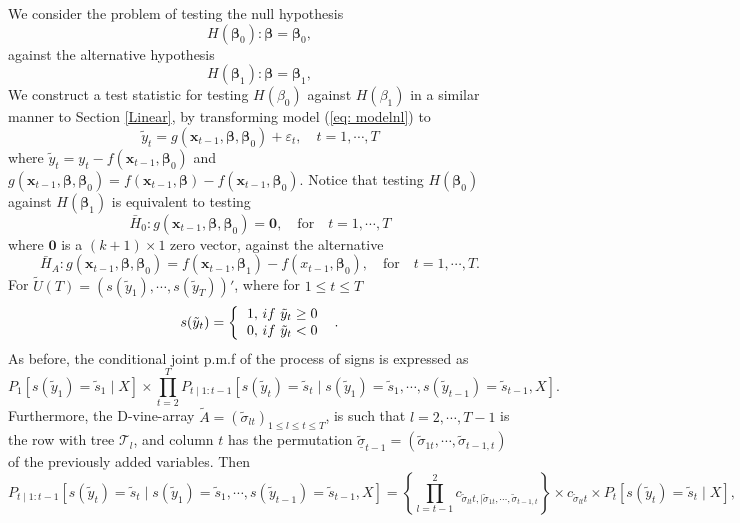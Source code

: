 \documentclass[harvard,11pt]{article}
\begin{document}
We consider the problem of testing the null hypothesis
\begin{equation}\label{eq: nullnl}
H(\bm{\beta}_0):\bm{\beta}=\bm{\beta}_0,
\end{equation}
against the alternative hypothesis
\begin{equation}\label{eq: altnl}
H(\bm{\beta}_1):\bm{\beta}=\bm{\beta}_1,
\end{equation}
We construct a test statistic for testing $H(\beta_0)$ against $H(\beta_1)$ in a similar manner to Section \ref{Linear}, by transforming model (\ref{eq: modelnl}) to 
\[
\tilde{y}_t=g(\bm{x}_{t-1},\bm{\beta},\bm{\beta}_0)+\varepsilon_t,\quad t=1,\cdots,T
\]
where $\tilde{y}_t=y_t-f(\bm{x}_{t-1},\bm{\beta}_0)$ and $g(\bm{x}_{t-1},\bm{\beta},\bm{\beta}_0)=f(\bm{x}_{t-1},\bm{\beta})-f(\bm{x}_{t-1},\bm{\beta}_0)$. Notice that testing $H(\bm{\beta}_0)$ against $H(\bm{\beta}_1)$ is equivalent to testing
\[
\bar{H}_0:g(\bm{x}_{t-1}, \bm{\beta},\bm{\beta}_0)=\bm{0},\quad\text{for}\quad t=1,\cdots,T
\]
where $\bm{0}$ is a $(k+1)\times 1$ zero vector, against the alternative
\[
\bar{H}_A: g(\bm{x}_{t-1},\bm{\beta},\bm{\beta}_0)=f(\bm{x}_{t-1},\bm{\beta}_1)-f(x_{t-1},\bm{\beta}_0),\quad\text{for}\quad t=1,\cdots,T.
\]
For $\tilde{U}(T)=(s(\tilde{y}_1),\cdots,s(\tilde{y}_T))'$, where for $1\leq t\leq T$
\begin{equation*}
s(\tilde{y}_{t})=\left\{ 
\begin{tabular}{l}
$1,$ $if$ $\tilde{y}_{t}\geq 0$ \\ 
$0,$ $if$ $\tilde{y}_{t}<0$%
\end{tabular}%
\ \right. \text{.}
\end{equation*}
As before, the conditional joint p.m.f of the process of signs is expressed as
\begin{equation}\label{eq: IDKANYMORE}
P_1[s(\tilde{y}_1)=\tilde{s}_1\mid X]\times\prod\limits_{t=2}^{T}P_{t\mid 1:{t-1}}[s(\tilde{y}_t)=\tilde{s}_t\mid s(\tilde{y}_1)=\tilde{s}_1,\cdots,s(\tilde{y}_{t-1})=\tilde{s}_{t-1},X].
\end{equation}
Furthermore, the D-vine-array $\tilde{A}=(\tilde{\sigma}_{lt})_{1\leq l\leq t\leq T}$, is such that $l=2,\cdots,T-1$ is the row with tree $\mathcal{T}_l$, and column $t$ has the permutation $\tilde{\underline{\sigma}}_{t-1}=(\tilde{\sigma}_{1t},\cdots,\tilde{\sigma}_{t-1,t})$ of the previously added variables. Then
\begin{equation}\label{eq: stober2}
P_{t\mid 1:{t-1}}[s(\tilde{y}_t)=\tilde{s}_t\mid s(\tilde{y}_1)=\tilde{s}_1,\cdots,s(\tilde{y}_{t-1})=\tilde{s}_{t-1},X]=\left\{\prod\limits_{l=t-1}^{2} c_{\tilde{\sigma}_{lt}t,\mid \tilde{\sigma}_{1t},\cdots,\tilde{\sigma}_{t-1,t}}\right\}\times c_{\tilde{\sigma}_{lt}t}\times P_t[s(\tilde{y}_t)=\tilde{s}_t\mid X],
\end{equation}
\end{document}
